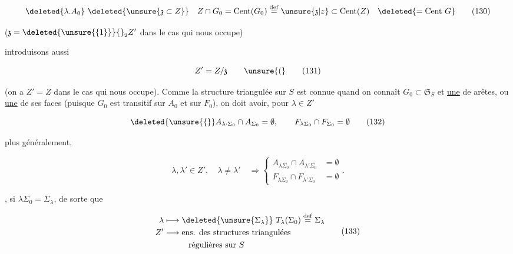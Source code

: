 \[
 \deleted{\lambda.A_0}\ \deleted{\unsure{\mathfrak z\subset Z}}
 \quad Z\cap G_0=\operatorname{Cent}(G_0)\overset{\mathrm{def}}{=}
 \unsure{\mathfrak z|z}\subset\operatorname{Cent}(Z)
 \quad\deleted{=\operatorname{Cent}\,G}
 \tag*{(130)}
\]

($\mathfrak z=\deleted{\unsure{\{1\}}}{}_{2}Z'$ dans le cas qui nous occupe)



 introduisons aussi

\[
 Z'=Z/\mathfrak z \qquad \unsure{(}
 \tag*{(131)}
\]

(on a $Z'=Z$ dans le cas qui nous occupe). Comme la structure triangulée  sur $S$ est connue quand on connaît $G_0\subset\mathfrak S_S$ et \uline{une} de  arêtes, ou \uline{une} de ses faces (puisque $G_0$ est transitif sur $A_0$ et sur $F_0$), on doit avoir, pour $\lambda\in Z'$

\[
 \deleted{\unsure{\{}} A_{\lambda\cdot\Sigma_0}\cap A_{\Sigma_0}=\emptyset,\qquad
 F_{\lambda\Sigma_0}\cap F_{\Sigma_0}=\emptyset
 \tag*{(132)}
\]


plus généralement, 

\[
 \lambda,\lambda'\in Z',\quad\lambda\ne\lambda'\quad\Longrightarrow
 \left\{\begin{aligned}
 A_{\lambda\Sigma_0}\cap A_{\lambda'\Sigma_0}&=\emptyset\\
 F_{\lambda\Sigma_0}\cap F_{\lambda'\Sigma_0}&=\emptyset
 \end{aligned}\right. .
 \tag*{(132bis)}
\]

  , si $\lambda\Sigma_0=\Sigma_\lambda$, de sorte que

\[
 \begin{aligned}
 \lambda&\longmapsto\deleted{\unsure{\Sigma_\lambda}}\ T_\lambda(\Sigma_0)\overset{\mathrm{def}}{=}\Sigma_\lambda\\
 Z'&\longrightarrow\text{ens. des structures triangulées}\\
 &\hspace{3em}\text{régulières sur }S
 \end{aligned}
 \tag*{(133)}
\]



